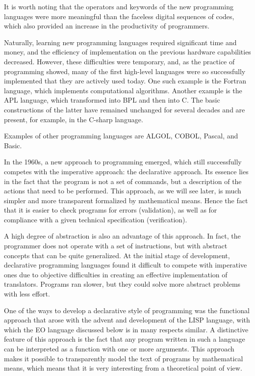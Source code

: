 \documentclass[12pt]{book}
\begin{document}
It is worth noting that the operators and keywords of the new programming languages were more meaningful than the faceless digital sequences of codes, which also provided an increase in the productivity of programmers.

Naturally, learning new programming languages required significant time and money, and the efficiency of implementation on the previous hardware capabilities decreased. However, these difficulties were temporary, and, as the practice of programming showed, many of the first high-level languages were so successfully implemented that they are actively used today. One such example is the Fortran language, which implements computational algorithms. Another example is the APL language, which transformed into BPL and then into C. The basic constructions of the latter have remained unchanged for several decades and are present, for example, in the C-sharp language.

Examples of other programming languages are ALGOL, COBOL, Pascal, and Basic.

In the 1960s, a new approach to programming emerged, which still successfully competes with the imperative approach: the declarative approach. Its essence lies in the fact that the program is not a set of commands, but a description of the actions that need to be performed. This approach, as we will see later, is much simpler and more transparent formalized by mathematical means. Hence the fact that it is easier to check programs for errors (validation), as well as for compliance with a given technical specification (verification).

A high degree of abstraction is also an advantage of this approach. In fact, the programmer does not operate with a set of instructions, but with abstract concepts that can be quite generalized. At the initial stage of development, declarative programming languages found it difficult to compete with imperative ones due to objective difficulties in creating an effective implementation of translators. Programs ran slower, but they could solve more abstract problems with less effort.

One of the ways to develop a declarative style of programming was the functional approach that arose with the advent and development of the LISP language, with which the EO language discussed below is in many respects similar. A distinctive feature of this approach is the fact that any program written in such a language can be interpreted as a function with one or more arguments. This approach makes it possible to transparently model the text of programs by mathematical means, which means that it is very interesting from a theoretical point of view.
\end{document}
